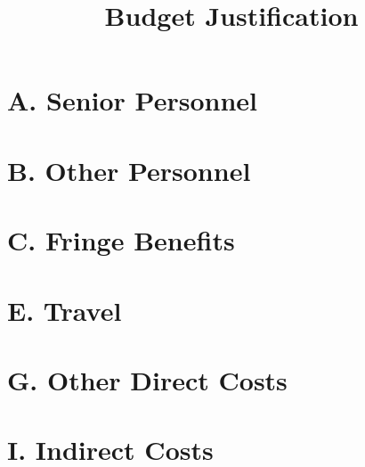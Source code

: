 \documentclass[11pt]{amsart}
\begin{document}
\title{Budget Justification}
\maketitle
\vspace{-1cm}

\section*{A. Senior Personnel}

\section*{B. Other Personnel}

\section*{C. Fringe Benefits}

\section*{E. Travel}

\section*{G. Other Direct Costs}

\section*{I. Indirect Costs}
\end{document}
